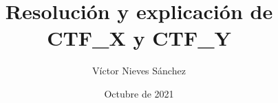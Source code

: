 \documentclass[a4paper, 12pt]{article} %
\author{Víctor Nieves Sánchez}
\date{Octubre de 2021}
\title{Resolución y explicación de CTF\_X y CTF\_Y}
\begin{document}
\maketitle
\null
\newpage
\begin{otherlanguage}{spanish}
    

%        

\newpage
\tableofcontents

\newpage
\listoffigures

\newpage
\renewcommand{\listtablename}{Lista de Tablas}
\listoftables

\newpage
\lstlistoflistings

\newpage
\printglossary[type=\acronymtype]

\newpage
    \begin{abstract}
        \normalsize
        
    \end{abstract}

\newpage
\begin{otherlanguage}{english}
    \renewcommand{\spanishabstractname}{Abstract}
    \begin{abstract}
        \normalsize
        
    \end{abstract}
\end{otherlanguage}
\newpage
{} %
\UseRawInputEncoding %

\newpage
\printbibliography[heading=bibnumbered] %

\end{otherlanguage}
\end{document}
